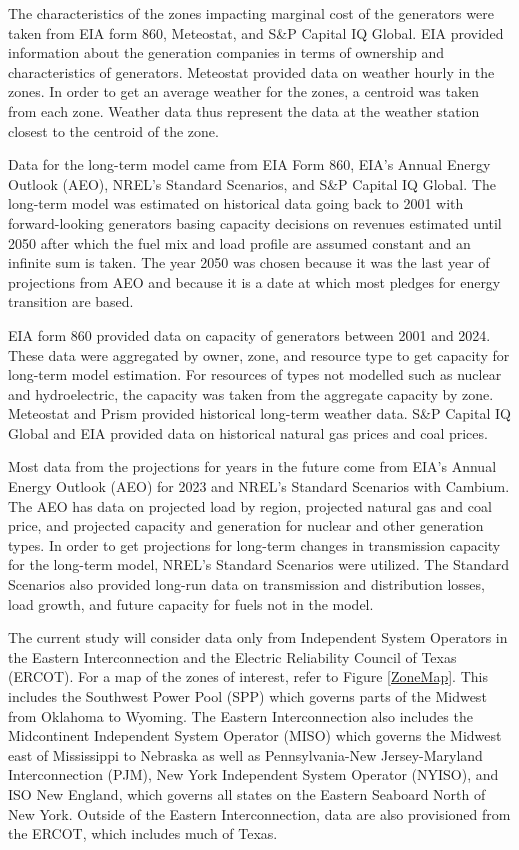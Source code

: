 \documentclass[12pt]{article}
\begin{document}
The characteristics of the zones impacting marginal cost of the generators were taken from EIA form 860, Meteostat, and S\&P Capital IQ Global. EIA provided information about the generation companies in terms of ownership and characteristics of generators. Meteostat provided data on weather hourly in the zones. In order to get an average weather for the zones, a centroid was taken from each zone. Weather data thus represent the data at the weather station closest to the centroid of the zone.

Data for the long-term model came from EIA Form 860, EIA's Annual Energy Outlook (AEO), NREL's Standard Scenarios, and S\&P Capital IQ Global. The long-term model was estimated on historical data going back to 2001 with forward-looking generators basing capacity decisions on revenues estimated until 2050 after which the fuel mix and load profile are assumed constant and an infinite sum is taken. The year 2050 was chosen because it was the last year of projections from AEO and because it is a date at which most pledges for energy transition are based.

EIA form 860 provided data on capacity of generators between 2001 and 2024. These data were aggregated by owner, zone, and resource type to get capacity for long-term model estimation. For resources of types not modelled such as nuclear and hydroelectric, the capacity was taken from the aggregate capacity by zone. Meteostat and Prism provided historical long-term weather data. S\&P Capital IQ Global and EIA provided data on historical natural gas prices and coal prices.

Most data from the projections for years in the future come from EIA's Annual Energy Outlook (AEO) for 2023 and NREL's Standard Scenarios with Cambium. The AEO has data on projected load by region, projected natural gas and coal price, and projected capacity and generation for nuclear and other generation types. In order to get projections for long-term changes in transmission capacity for the long-term model, NREL's Standard Scenarios were utilized. The Standard Scenarios also provided long-run data on transmission and distribution losses, load growth, and future capacity for fuels not in the model.

The current study will consider data only from Independent System Operators in the Eastern Interconnection and the Electric Reliability Council of Texas (ERCOT). For a map of the zones of interest, refer to Figure \ref{ZoneMap}. This includes the Southwest Power Pool (SPP) which governs parts of the Midwest from Oklahoma to Wyoming. The Eastern Interconnection also includes the Midcontinent Independent System Operator (MISO) which governs the Midwest east of Mississippi to Nebraska as well as Pennsylvania-New Jersey-Maryland Interconnection (PJM), New York Independent System Operator (NYISO), and ISO New England, which governs all states on the Eastern Seaboard North of New York. Outside of the Eastern Interconnection, data are also provisioned from the ERCOT, which includes much of Texas.
\end{document}
